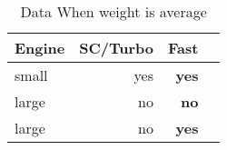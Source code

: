 \begin{table}[!htp]\centering
    \caption{Data When weight is average}\label{table:weight_average}
    \scriptsize
    \begin{tabular}{lrrr}\toprule
        \textbf{Engine} & \textbf{SC/Turbo} & \textbf{Fast} \\\midrule
        small           & yes               & \textbf{yes}  \\
        large           & no                & \textbf{no}   \\
        large           & no                & \textbf{yes}  \\
        \bottomrule
    \end{tabular}
\end{table}